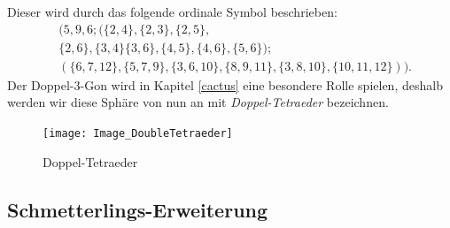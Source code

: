 \documentclass[12pt,titlepage,twoside,cleardoublepage]{article}
\theoremstyle{nummermitklammern}
\numberwithin{equation}{section}
\begin{document}
 Dieser wird durch das folgende ordinale Symbol beschrieben:
 \begin{align*}
 &(5,9,6;(\{2,4\},\{2,3\},\{2,5\},\\
 &\{2,6\},\{3,4\}\{3,6\},\{4,5\},\{4,6\},\{5,6\});\\
 &(\{6,7,12\},\{5,7,9\},\{3,6,10\},\{8,9,11\},\{3,8,10\},\{10,11,12\})).
 \end{align*}
 Der Doppel-3-Gon wird in Kapitel \ref{cactus} eine besondere Rolle spielen, deshalb werden wir diese Sphäre von nun an mit \emph{Doppel-Tetraeder} bezeichnen.
 \begin{figure}[H]
\begin{center}
\texttt{[image: Image\_DoubleTetraeder]}
\end{center}
\caption{Doppel-Tetraeder}
\end{figure}
 \subsection{Schmetterlings-Erweiterung}
\end{document}
